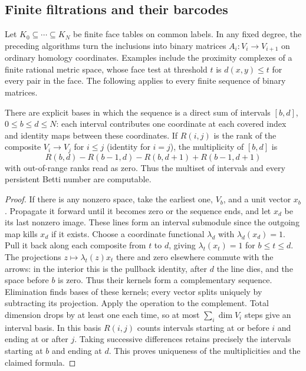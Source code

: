 \subsection{Finite filtrations and their barcodes}
Let $K_0\subseteq\cdots\subseteq K_N$ be finite face tables on common
labels. In any fixed degree, the preceding algorithms turn the inclusions
into binary matrices $A_i:V_i\to V_{i+1}$ on ordinary homology
coordinates. Examples include the proximity complexes of a finite
rational metric space, whose face test at threshold $t$ is
$d(x,y)\le t$ for every pair in the face. The following applies to
every finite sequence of binary matrices.

\begin{theorem}\label{idx-algebraic480}
There are explicit bases in which the sequence is a direct sum of
intervals $[b,d]$, $0\le b\le d\le N$: each interval contributes one
coordinate at each covered index and identity maps between these
coordinates. If $R(i,j)$ is the rank of the composite $V_i\to V_j$
for $i\le j$ (identity for $i=j$), the multiplicity of $[b,d]$ is
\[
 R(b,d)-R(b-1,d)-R(b,d+1)+R(b-1,d+1)
\]
with out-of-range ranks read as zero. Thus the multiset of intervals
and every persistent Betti number are computable.
\end{theorem}
\begin{proof}
If there is any nonzero space, take the earliest one, $V_b$, and a unit
vector $x_b$. Propagate it forward until it becomes zero or the sequence
ends, and let $x_d$ be its last nonzero image. These lines form an
interval submodule since the outgoing map kills $x_d$ if it exists.
Choose a coordinate functional $\lambda_d$ with
$\lambda_d(x_d)=1$. Pull it back along each composite from $t$ to $d$,
giving $\lambda_t(x_t)=1$ for $b\le t\le d$. The projections
$z\mapsto\lambda_t(z)x_t$ there and zero elsewhere commute with the
arrows: in the interior this is the pullback identity, after $d$ the
line dies, and the space before $b$ is zero. Thus their kernels form
a complementary sequence. Elimination finds bases of these kernels;
every vector splits uniquely by subtracting its projection. Apply
the operation to the complement. Total dimension drops by at least one
each time, so at most $\sum_i\dim V_i$ steps give an interval basis.
In this basis $R(i,j)$ counts intervals starting at or before $i$ and
ending at or after $j$. Taking successive differences retains precisely
the intervals starting at $b$ and ending at $d$. This proves uniqueness
of the multiplicities and the claimed formula.
\end{proof}

